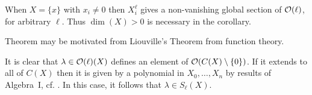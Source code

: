 \documentclass[a4paper,parskip=half,numbers=enddot, DIV=12, headheight=30pt]{scrreprt}
\begin{document}
\begin{rem*}
    \begin{alphanumerate}
        \item 
            When $X=\{x\}$ with $x_i\neq 0$ then $X_i^\ell$ gives a non-vanishing global section of $\mathcal{O}(\ell)$, for arbitrary $\ell$. Thus $\dim(X)>0$ is necessary in the corollary.
        \item 
            Theorem  may be motivated from Liouville's Theorem from function theory.
        \item   
            It is clear that $\lambda\in \mathcal{O}(\ell)(X)$ defines an element of $\mathcal{O}(C(X)\setminus\{0\})$. If it extends to all of $C(X)$ then it is given by a polynomial in $X_0,\ldots, X_n$ by results of Algebra~I, cf. \cite[Proposition~2.2.2]{alg1}. In this case, it follows that $\lambda\in S_\ell(X)$.
            

\end{alphanumerate}
\end{rem*}
\end{document}
